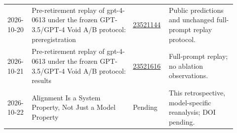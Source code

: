\begin{longtable}{@{}p{0.105\linewidth}p{0.425\linewidth}p{0.11\linewidth}p{0.28\linewidth}@{}}
2026-10-20 & Pre-retirement replay of gpt-4-0613 under the frozen GPT-3.5/GPT-4 Void A/B protocol: preregistration & \href{https://doi.org/10.5281/zenodo.23521144}{23521144} & Public predictions and unchanged full-prompt replay protocol. \\[0.4em]
2026-10-21 & Pre-retirement replay of gpt-4-0613 under the frozen GPT-3.5/GPT-4 Void A/B protocol: results & \href{https://doi.org/10.5281/zenodo.23521616}{23521616} & Full-prompt replay; no ablation observations. \\[0.4em]
2026-10-22 & Alignment Is a System Property, Not Just a Model Property & Pending & This retrospective, model-specific reanalysis; DOI pending. \\[0.4em]
\bottomrule\end{longtable}
